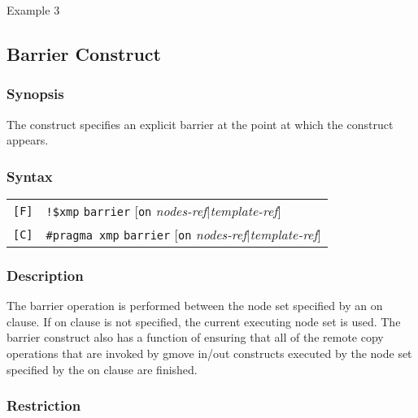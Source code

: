\begin{description}
\item[Example 3]
\hspace{\hsize}

\end{description}

\subsection{Barrier Construct}

\subsubsection*{Synopsis}

The {\tt {}} construct specifies an explicit barrier
at the point at which the construct appears. 

\subsubsection*{Syntax}

\begin{tabular}{ll}
\verb![F]! & \verb|!$xmp| {\tt barrier} [{\tt on} {\it nodes-ref}$\vert${\it template-ref}] \\
\verb![C]! & \verb|#pragma xmp| {\tt barrier} [{\tt on} {\it nodes-ref}$\vert${\it template-ref}] \\
\end{tabular}

\subsubsection*{Description}

The barrier operation is performed between the node set specified by
an on clause. If on clause is not specified, the current executing
node set is used.
%
The barrier construct also has a function of ensuring that all of the
remote copy operations that are invoked by gmove in/out constructs
executed by the node set specified by the on clause are finished.

\subsubsection*{Restriction}

